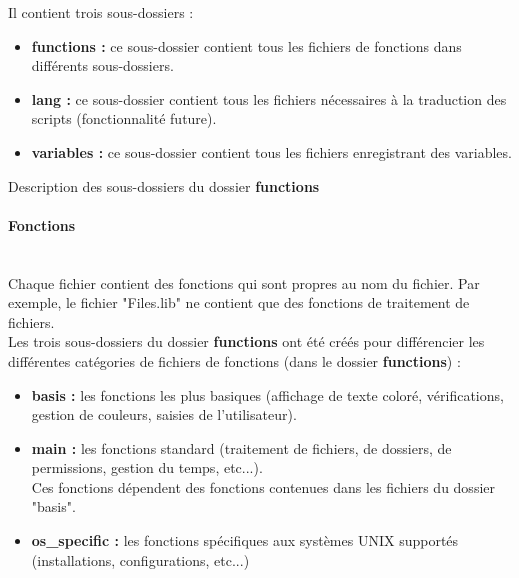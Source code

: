 \documentclass[a4paper,10pt]{article}
\begin{document}
Il contient trois sous-dossiers :
\begin{itemize}
    \item \color{lime}\textbf{functions\color{white} :} \color{white} ce sous-dossier contient tous les fichiers de fonctions dans différents sous-dossiers.\\[1\baselineskip]

    \item \color{lime}\textbf{lang\color{white} :} \color{white} ce sous-dossier contient tous les fichiers nécessaires à la traduction des scripts (fonctionnalité future).\\[1\baselineskip]

    \item \color{lime}\textbf{variables\color{white} :} \color{white} ce sous-dossier contient tous les fichiers enregistrant des variables.\\[1\baselineskip]
\end{itemize}

Description des sous-dossiers du dossier \textbf{functions}
\setcounter{secnumdepth}{4}
\paragraph{Fonctions}\mbox{}\\
Chaque fichier contient des fonctions qui sont propres au nom du fichier. Par exemple, le fichier "Files.lib" ne contient que des fonctions de traitement de fichiers.\\[1\baselineskip]

Les trois sous-dossiers du dossier \textbf{functions} ont été créés pour différencier les différentes catégories de fichiers de fonctions (dans le dossier \textbf{functions}) :
\begin{itemize}
    \item \color{lime}\textbf{basis\color{white} :} \color{white} les fonctions les plus basiques (affichage de texte coloré, vérifications, gestion de couleurs, saisies de l'utilisateur).\\[1\baselineskip]
    
    \item \color{lime}\textbf{main\color{white} :} \color{white} les fonctions standard (traitement de fichiers, de dossiers, de permissions, gestion du temps, etc...).\\[1\baselineskip]

    Ces fonctions dépendent des fonctions contenues dans les fichiers du dossier "basis".\\[1\baselineskip]

    \item \color{lime}\textbf{os\_specific\color{white} :} \color{white} les fonctions spécifiques aux systèmes UNIX supportés (installations, configurations, etc...)\\[1\baselineskip]
\end{itemize}
\end{document}
